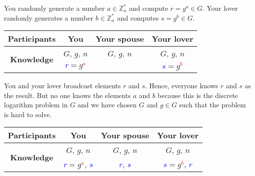 You randomly generate a number $a\in \mathbb Z_n^*$ and compute $r = g^a\in G$. Your lover randomly generates a number $b\in \mathbb Z_n^*$ and computes $s = g^b\in G$.
\begin{center}
\begin{tabular}{|c|c|c|c|}
\hline
{\bf Participants}&{You}&{Your spouse}&{Your lover}\\
\hline
\multirow{2}{*}{\bf Knowledge}&{\textcolor{OliveGreen}{$G$}, \textcolor{OliveGreen}{$g$}, \textcolor{OliveGreen}{$n$}}&{\textcolor{OliveGreen}{$G$}, \textcolor{OliveGreen}{$g$}, \textcolor{OliveGreen}{$n$}}&{\textcolor{OliveGreen}{$G$}, \textcolor{OliveGreen}{$g$}, \textcolor{OliveGreen}{$n$}}\\
{}&{ \textcolor{blue}{$r$}$=$\textcolor{OliveGreen}{$ g$}\textcolor{red}{${}^a$}}&{}&{ \textcolor{blue}{$s$}$=$\textcolor{OliveGreen}{$g$}\textcolor{red}{${}^b$}}\\
\hline
\end{tabular}
\end{center}

You and your lover broadcast elements $r$ and $s$. Hence, everyone knows $r$ and $s$ as the result. But no one knows the elements $a$ and $b$ because this is the discrete logarithm problem in $G$ and we have chosen $G$ and $g\in G$ such that the problem is hard to solve.
\begin{center}
\begin{tabular}{|c|c|c|c|}
\hline
{\bf Participants}&{You}&{Your spouse}&{Your lover}\\
\hline
\multirow{2}{*}{\bf Knowledge}&{\textcolor{OliveGreen}{$G$}, \textcolor{OliveGreen}{$g$}, \textcolor{OliveGreen}{$n$}}&{\textcolor{OliveGreen}{$G$}, \textcolor{OliveGreen}{$g$}, \textcolor{OliveGreen}{$n$}}&{\textcolor{OliveGreen}{$G$}, \textcolor{OliveGreen}{$g$}, \textcolor{OliveGreen}{$n$}}\\
{}&{ \textcolor{blue}{$r$}$=$\textcolor{OliveGreen}{$ g$}\textcolor{red}{${}^a$}, \textcolor{blue}{$s$}}&{\textcolor{blue}{$r$, $s$}}&{ \textcolor{blue}{$s$}$=$\textcolor{OliveGreen}{$g$}\textcolor{red}{${}^b$}, \textcolor{blue}{$r$}}\\
\hline
\end{tabular}
\end{center}

